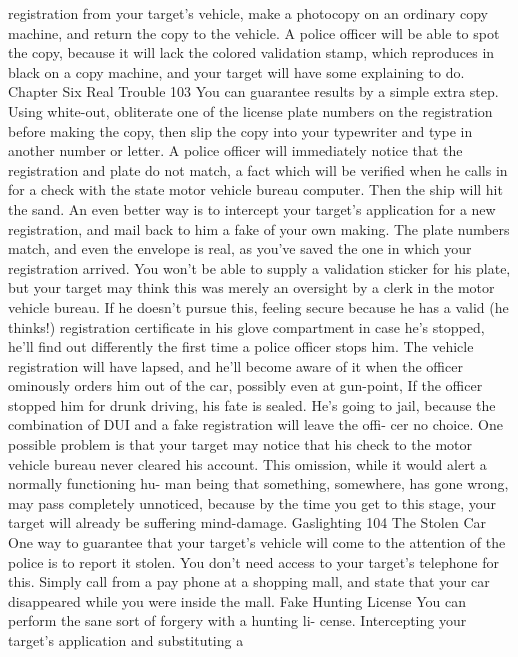 \documentclass{book}
\begin{document}
registration from your target's vehicle, make a photocopy on an 
ordinary copy machine, and return the copy to the vehicle. A 
police officer will be able to spot the copy, because it will lack 
the colored validation stamp, which reproduces in black on a 
copy machine, and your target will have some explaining to do. 
Chapter Six 
Real Trouble 
103 
You can guarantee results by a simple extra step. Using 
white-out, obliterate one of the license plate numbers on the 
registration before making the copy, then slip the copy into 
your typewriter and type in another number or letter. A police 
officer will immediately notice that the registration and plate do 
not match, a fact which will be verified when he calls in for a 
check with the state motor vehicle bureau computer. Then the 
ship will hit the sand. 
An even better way is to intercept your target's application 
for a new registration, and mail back to him a fake of your own 
making. The plate numbers match, and even the envelope is 
real, as you've saved the one in which your registration arrived. 
You won't be able to supply a validation sticker for his plate, 
but your target may think this was merely an oversight by a 
clerk in the motor vehicle bureau. If he doesn't pursue this, 
feeling secure because he has a valid (he thinks!) registration 
certificate in his glove compartment in case he's stopped, he'll 
find out differently the first time a police officer stops him. 
The vehicle registration will have lapsed, and he'll become 
aware of it when the officer ominously orders him out of the 
car, possibly even at gun-point, If the officer stopped him for 
drunk driving, his fate is sealed. He's going to jail, because the 
combination of DUI and a fake registration will leave the offi- 
cer no choice. 
One possible problem is that your target may notice that his 
check to the motor vehicle bureau never cleared his account. 
This omission, while it would alert a normally functioning hu- 
man being that something, somewhere, has gone wrong, may 
pass completely unnoticed, because by the time you get to this 
stage, your target will already be suffering mind-damage.  Gaslighting 
104 
The Stolen Car 
One way to guarantee that your target's vehicle will come to 
the attention of the police is to report it stolen. You don't need 
access to your target's telephone for this. Simply call from a pay 
phone at a shopping mall, and state that your car disappeared 
while you were inside the mall. 
Fake Hunting License 
You can perform the sane sort of forgery with a hunting li- 
cense. Intercepting your target's application and substituting a 
\end{document}
